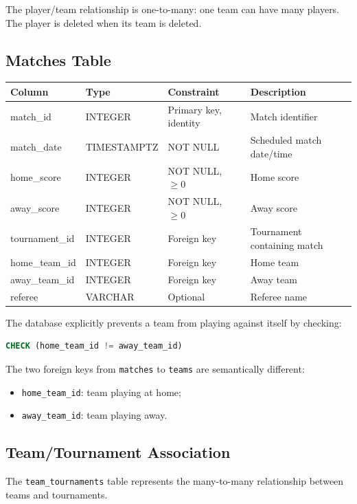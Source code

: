 \documentclass[12pt,a4paper]{article}
\begin{document}
The player/team relationship is one-to-many: one team can have many
players. The player is deleted when its team is deleted.

\subsection{Matches Table}

\begin{longtable}{p{3.0cm}p{3.0cm}p{4.0cm}p{4.0cm}}
\toprule
\textbf{Column} & \textbf{Type} & \textbf{Constraint} & \textbf{Description}\\
\midrule
\endhead
match\_id & INTEGER & Primary key, identity & Match identifier\\
match\_date & TIMESTAMPTZ & NOT NULL & Scheduled match date/time\\
home\_score & INTEGER & NOT NULL, $\geq 0$ & Home score\\
away\_score & INTEGER & NOT NULL, $\geq 0$ & Away score\\
tournament\_id & INTEGER & Foreign key & Tournament containing match\\
home\_team\_id & INTEGER & Foreign key & Home team\\
away\_team\_id & INTEGER & Foreign key & Away team\\
referee & VARCHAR & Optional & Referee name\\
\bottomrule
\end{longtable}

The database explicitly prevents a team from playing against itself by
checking:

\begin{lstlisting}[language=SQL]
CHECK (home_team_id != away_team_id)
\end{lstlisting}

The two foreign keys from \texttt{matches} to \texttt{teams} are
semantically different:

\begin{itemize}
    \item \texttt{home\_team\_id}: team playing at home;
    \item \texttt{away\_team\_id}: team playing away.
\end{itemize}

\subsection{Team/Tournament Association}

The \texttt{team\_tournaments} table represents the many-to-many
relationship between teams and tournaments.
\end{document}

